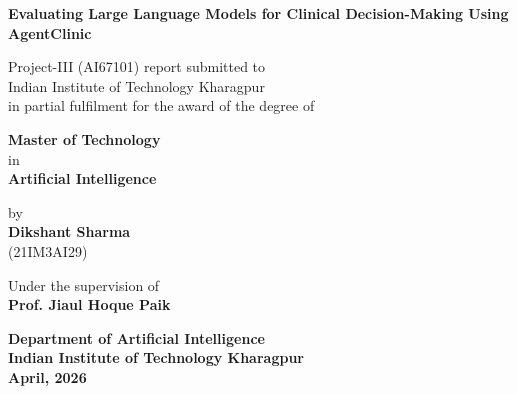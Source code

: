 \documentclass[12pt, a4paper, twoside]{report}
\begin{document}
\begin{titlepage}
    \begin{center}
        \vspace*{1cm}
        
        \Huge
        \textbf{Evaluating Large Language Models for Clinical Decision-Making Using AgentClinic}
        
        \vspace{1.5cm}
        
        \Large
        Project-III (AI67101) report submitted to \\
        Indian Institute of Technology Kharagpur \\
        in partial fulfilment for the award of the degree of
        
        \vspace{0.8cm}
        \textbf{Master of Technology} \\
        in \\
        \textbf{Artificial Intelligence}
        
        \vspace{2cm}
        
        \Large
        by \\
        \textbf{Dikshant Sharma} \\
        (21IM3AI29)
        
        \vspace{1.5cm}
        
        Under the supervision of \\
        \textbf{Prof. Jiaul Hoque Paik}
        
        \vspace{2cm}
        
        
        \vspace{1.5cm}
        
        \Large
        \textbf{Department of Artificial Intelligence}\\
        \textbf{Indian Institute of Technology Kharagpur}\\
        \textbf{April, 2026}
        
    \end{center}
\end{titlepage}
\end{document}
